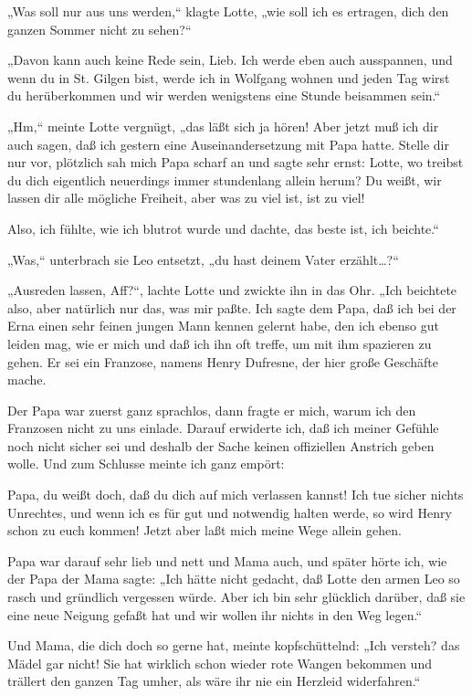„Was soll nur aus uns werden,“ klagte Lotte, „wie
soll ich es ertragen, dich den ganzen Sommer nicht zu sehen?“

„Davon kann auch keine Rede sein, Lieb. Ich werde eben auch
ausspannen, und wenn du in St. Gilgen bist, werde ich in Wolfgang
wohnen und jeden Tag wirst du herüberkommen und wir werden
wenigstens eine Stunde beisammen sein.“

„Hm,“ meinte Lotte vergnügt, „das läßt sich ja hören! Aber jetzt
muß ich dir auch sagen, daß ich gestern eine Auseinandersetzung mit
Papa hatte. Stelle dir nur vor, plötzlich sah mich Papa scharf an
und sagte sehr ernst: Lotte, wo treibst du dich eigentlich
neuerdings immer stundenlang allein herum? Du weißt, wir lassen dir
alle mögliche Freiheit, aber was zu viel ist, ist zu viel!

Also, ich fühlte, wie ich blutrot wurde und dachte, das beste ist,
ich beichte.“

„Was,“ unterbrach sie Leo entsetzt, „du hast deinem Vater
erzählt\ldots{}?“

„Ausreden lassen, Aff?“, lachte Lotte und zwickte ihn in das Ohr.
„Ich beichtete also, aber natürlich nur das, was mir paßte. Ich
sagte dem Papa, daß ich bei der Erna einen sehr feinen jungen Mann
kennen gelernt habe, den ich ebenso gut leiden mag, wie er mich und
daß ich ihn oft treffe, um mit ihm spazieren zu gehen. Er sei ein
Franzose, namens Henry Dufresne, der hier große Geschäfte mache.

Der Papa war zuerst ganz sprachlos, dann fragte er mich, warum ich
den Franzosen nicht zu uns einlade.  Darauf
erwiderte ich, daß ich meiner Gefühle noch nicht sicher sei und
deshalb der Sache keinen offiziellen Anstrich geben wolle. Und zum
Schlusse meinte ich ganz empört:

Papa, du weißt doch, daß du dich auf mich verlassen kannst! Ich tue
sicher nichts Unrechtes, und wenn ich es für gut und notwendig
halten werde, so wird Henry schon zu euch kommen! Jetzt aber laßt
mich meine Wege allein gehen.

Papa war darauf sehr lieb und nett und Mama auch, und später hörte
ich, wie der Papa der Mama sagte: „Ich hätte nicht gedacht, daß
Lotte den armen Leo so rasch und gründlich vergessen würde. Aber
ich bin sehr glücklich darüber, daß sie eine neue Neigung gefaßt
hat und wir wollen ihr nichts in den Weg legen.“

Und Mama, die dich doch so gerne hat, meinte kopfschüttelnd: „Ich
versteh? das Mädel gar nicht! Sie hat wirklich schon wieder rote
Wangen bekommen und trällert den ganzen Tag umher, als wäre ihr nie
ein Herzleid widerfahren.“

